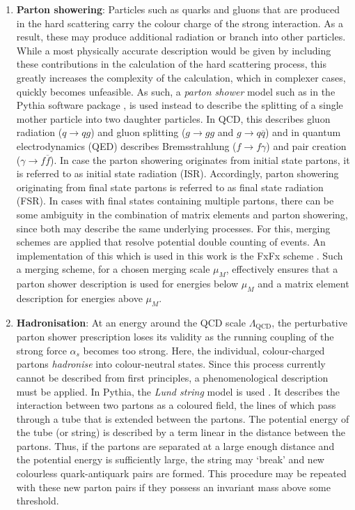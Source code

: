 \begin{enumerate}
    \item \textbf{Parton showering}: Particles such as quarks and gluons that are produced in the hard scattering carry the colour charge of the strong interaction. As a result, these may produce additional radiation or branch into other particles. While a most physically accurate description would be given by including these contributions in the calculation of the hard scattering process, this greatly increases the complexity of the calculation, which in complexer cases, quickly becomes unfeasible. As such, a \textit{parton shower} model such as in the \textsf{Pythia} software package \cite{PYTHIA}, is used instead to describe the splitting of a single mother particle into two daughter particles. In QCD, this describes gluon radiation ($q\rightarrow qg$) and gluon splitting ($g\rightarrow gg$ and $g \rightarrow q \overline{q}$) and in quantum electrodynamics (QED) describes Bremsstrahlung ($f\rightarrow f\gamma$) and pair creation ($\gamma \rightarrow f \overline{f}$). In case the parton showering originates from initial state partons, it is referred to as initial state radiation (ISR). Accordingly, parton showering originating from final state partons is referred to as final state radiation (FSR). In cases with final states containing multiple partons, there can be some ambiguity in the combination of matrix elements and parton showering, since both may describe the same underlying processes. For this, merging schemes are applied that resolve potential double counting of events. An implementation of this which is used in this work is the FxFx scheme \cite{FxFx}. Such a merging scheme, for a chosen merging scale $\mu_{M}$, effectively ensures that a parton shower description is used for energies below $\mu_{M}$ and a matrix element description for energies above $\mu_{M}$. 
    \item \textbf{Hadronisation}: At an energy around the QCD scale $\Lambda_{\mathrm{QCD}}$, the perturbative parton shower prescription loses its validity as the running coupling of the strong force $\alpha_{s}$ becomes too strong. Here, the individual, colour-charged partons \textit{hadronise} into colour-neutral states.  Since this process currently cannot be described from first principles, a phenomenological description must be applied. In \textsf{Pythia}, the \textit{Lund string} model is used \cite{LundStringModel}. It describes the interaction between two partons as a coloured field, the lines of which pass through a tube that is extended between the partons. The potential energy of the tube (or string) is described by a term linear in the distance between the partons. Thus, if the partons are separated at a large enough distance and the potential energy is sufficiently large, the string may `break' and new colourless quark-antiquark pairs are formed. This procedure may be repeated with these new parton pairs if they possess an invariant mass above some threshold. 

\end{enumerate}
